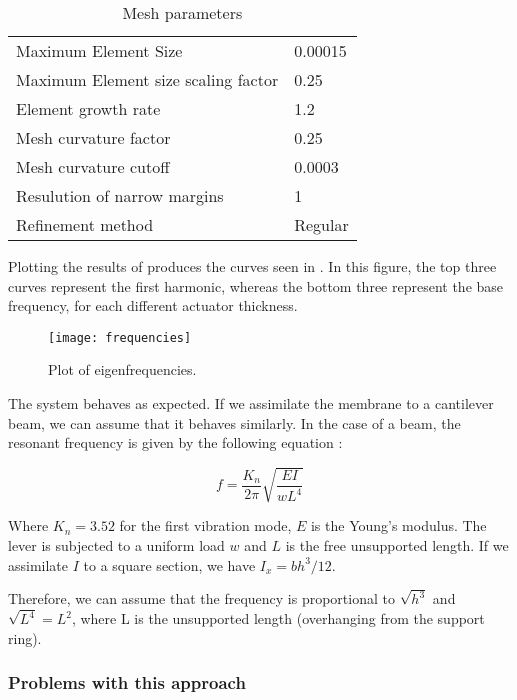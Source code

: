 \begin{table}[h]
  \centering
  \begin{tabular}{l|l}
    Maximum Element Size		&	0.00015	\\
    Maximum Element size scaling factor	&	0.25	\\
    Element growth rate			&	1.2	\\
    Mesh curvature factor		&	0.25	\\
    Mesh curvature cutoff		&	0.0003	\\
    Resulution of narrow margins	&	1	\\
    Refinement method			&	Regular	\\
  \end{tabular}
  \caption{Mesh parameters}
  \label{tab:mesh}
\end{table}

Plotting the results of  produces the curves seen in
. In this figure, the top three curves represent the first
harmonic, whereas the bottom three represent the base frequency, for each
different actuator thickness. 

\begin{figure}[h]
  \begin{center}
    \texttt{[image: frequencies]}
  \end{center}
  \caption{Plot of eigenfrequencies.}
  \label{fig:frequencies}
\end{figure}

The system behaves as expected. If we assimilate the membrane to a cantilever
beam, we can assume that it behaves similarly. In the case of a beam, the
resonant frequency is given by the following equation \cite{roark2002}:

\begin{equation}
  f = \frac{K_n}{2\pi} \sqrt{\frac{E I}{w L^4}}
  \label{eq:beam}
\end{equation}

Where $K_n = 3.52$ for the first vibration mode, $E$ is the Young's modulus. The
lever is subjected to a uniform load $w$ and $L$ is the free unsupported length.
If we assimilate $I$ to a square section, we have $I_x = {b h^3}/{12}$.

Therefore, we can assume that the frequency is proportional to $\sqrt{h^3}$ and
$\sqrt{L^4} = L^2$, where L is the unsupported length (overhanging from the
support ring).

\subsubsection{Problems with this approach}


